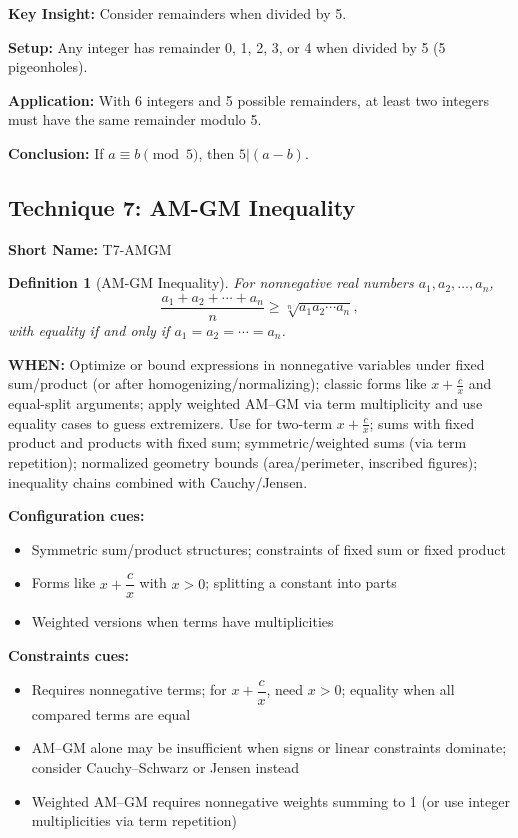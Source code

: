 \documentclass[12pt]{article}
\newtheorem{definition}{Definition}[section]
\newenvironment{solution}
{\begin{tcolorbox}[colback=green!5!white,colframe=green!75!black,title={Solution}]}{\end{tcolorbox}}
\begin{document}
\begin{solution}
\textbf{Key Insight:} Consider remainders when divided by 5.

\textbf{Setup:} Any integer has remainder 0, 1, 2, 3, or 4 when divided by 5 (5 pigeonholes).

\textbf{Application:} With 6 integers and 5 possible remainders, at least two integers must have the same remainder modulo 5.

\textbf{Conclusion:} If $a \equiv b \pmod{5}$, then $5 | (a - b)$.
\end{solution}

\subsection{Technique 7: AM-GM Inequality}
\textbf{Short Name:} T7-AMGM

\begin{definition}[AM-GM Inequality]
For nonnegative real numbers $a_1, a_2, \ldots, a_n$,
\[
\frac{a_1 + a_2 + \cdots + a_n}{n} \ge \sqrt[n]{a_1 a_2 \cdots a_n},
\]
with equality if and only if $a_1 = a_2 = \cdots = a_n$.
\end{definition}

\textbf{WHEN:} Optimize or bound expressions in nonnegative variables under fixed sum/product (or after homogenizing/normalizing); classic forms like $x+\tfrac{c}{x}$ and equal-split arguments; apply weighted AM–GM via term multiplicity and use equality cases to guess extremizers. Use for two-term $x+\tfrac{c}{x}$; sums with fixed product and products with fixed sum; symmetric/weighted sums (via term repetition); normalized geometry bounds (area/perimeter, inscribed figures); inequality chains combined with Cauchy/Jensen.

\textbf{Configuration cues:}
\begin{itemize}
    \item Symmetric sum/product structures; constraints of fixed sum or fixed product
    \item Forms like $x + \dfrac{c}{x}$ with $x > 0$; splitting a constant into parts
    \item Weighted versions when terms have multiplicities
\end{itemize}

\textbf{Constraints cues:}
\begin{itemize}
    \item Requires nonnegative terms; for $x + \dfrac{c}{x}$, need $x > 0$; equality when all compared terms are equal
    \item AM--GM alone may be insufficient when signs or linear constraints dominate; consider Cauchy--Schwarz or Jensen instead
    \item Weighted AM--GM requires nonnegative weights summing to 1 (or use integer multiplicities via term repetition)
\end{itemize}
\end{document}
